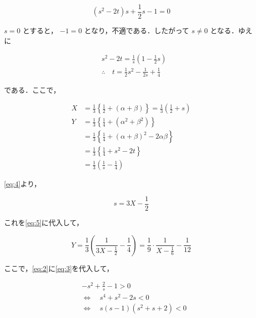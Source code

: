 \documentclass[a4paper]{ltjsarticle}
\begin{document}
\begin{equation*}
    (s^2-2t)s+\frac{1}{2}s-1=0
\end{equation*}

$s=0$ とすると， $-1=0$ となり，不適である．したがって $s\neq 0$ となる．ゆえに

\begin{align}
     & s^2-2t=\frac{1}{s}\left(1-\frac{1}{2}s\right)\nonumber                \\
     & \therefore\quad t=\frac{1}{2}s^2-\frac{1}{2s}+\frac{1}{4}\label{eq:3}
\end{align}

である．ここで，

\begin{align}
    X & =\frac{1}{3}\left\{\frac{1}{2}+(\alpha+\beta)\right\}=\frac{1}{3}\left(\frac{1}{2}+s\right)\label{eq:4} \\
    Y & =\frac{1}{3}\left\{\frac{1}{4}+(\alpha^2+\beta^2)\right\}                                               \\
      & =\frac{1}{3}\left\{\frac{1}{4}+(\alpha+\beta)^2-2\alpha\beta\right\}\nonumber                           \\
      & =\frac{1}{3}\left\{\frac{1}{4}+s^2-2t\right\}\nonumber                                                  \\
      & =\frac{1}{3}\left(\frac{1}{s}-\frac{1}{4}\right)\label{eq:5}
\end{align}

\eqref{eq:4}より，

\begin{equation}
    s=3X-\frac{1}{2}\label{eq:6}
\end{equation}

これを\eqref{eq:5}に代入して，

\begin{equation}
    Y=\frac{1}{3}\left(\frac{1}{3X-\frac{1}{2}}-\frac{1}{4}\right)=\frac{1}{9}\cdot\frac{1}{X-\frac{1}{6}}-\frac{1}{12}\label{eq:7}
\end{equation}

ここで，\eqref{eq:2}に\eqref{eq:3}を代入して，

\begin{align}
     & -s^2+\frac{2}{s}-1>0\nonumber                     \\
     & \Longleftrightarrow\quad s^4+s^2-2s<0\nonumber    \\
     & \Longleftrightarrow\quad s(s-1)(s^2+s+2)<0\tag{*}
\end{align}
\end{document}
